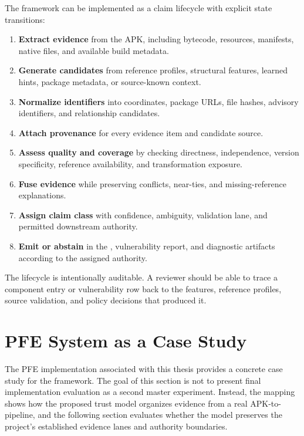The framework can be implemented as a claim lifecycle with explicit state
transitions:

\begin{enumerate}
  \item \textbf{Extract evidence} from the APK, including bytecode,
  resources, manifests, native files, and available build metadata.
  \item \textbf{Generate candidates} from reference profiles, structural
  features, learned hints, package metadata, or source-known context.
  \item \textbf{Normalize identifiers} into coordinates, package URLs, file
  hashes, advisory identifiers, and relationship candidates.
  \item \textbf{Attach provenance} for every evidence item and candidate
  source.
  \item \textbf{Assess quality and coverage} by checking directness,
  independence, version specificity, reference availability, and transformation
  exposure.
  \item \textbf{Fuse evidence} while preserving conflicts, near-ties, and
  missing-reference explanations.
  \item \textbf{Assign claim class} with confidence, ambiguity, validation
  lane, and permitted downstream authority.
  \item \textbf{Emit or abstain} in the \SBOM, vulnerability report, and
  diagnostic artifacts according to the assigned authority.
\end{enumerate}

The lifecycle is intentionally auditable. A reviewer should be able to trace a
\CycloneDX component entry or vulnerability row back to the features, reference
profiles, source validation, and policy decisions that produced it.

\section{PFE System as a Case Study}

The PFE implementation associated with this thesis provides a concrete case
study for the framework. The goal of this section is not to present final
implementation evaluation as a second master experiment. Instead, the mapping
shows how the proposed trust model organizes evidence from a real
APK-to-\SBOM pipeline, and the following section evaluates whether the model
preserves the project's established evidence lanes and authority boundaries.

